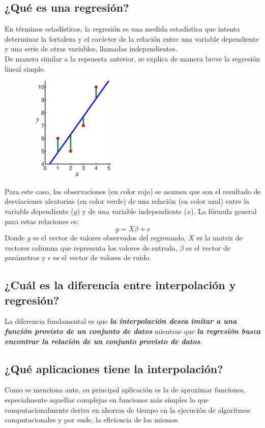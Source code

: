 \documentclass[letterpaper, 12pt]{article}
\begin{document}
\subsection*{¿Qué es una regresión?}
\justify
En términos estadísticos, la regresión es una medida estadística que intenta determinar la fortaleza y el carácter de la relación entre una variable dependiente
y una serie de otras variables, llamadas independientes. 
\\\newline
De manera similar a la repsuesta anterior, se explica de manera breve la regresión lineal simple.
\begin{figure}[H]
    \centering
    \includegraphics[width=5cm,height=5cm]{330px-Linear_least_squares_example2.png}
\end{figure}
\justify
Para este caso, las observaciones (en color rojo) se asumen que son el resultado de desviaciones aleatorias (en color verde) de una relación (en color azul) entre la variable dependiente (\(y\))
y de una variable independiente (\(x\)). La fórmula general para estas relaciones es:
{\large\[y=X\beta+\epsilon\]}
\justify
Donde \(y\) es el vector de valores observados del regresando, \(X\) es la matriz de vectores columna que representa los valores de entrada, \(\beta\) es el vector de parámetros y \(\epsilon\)
es el vector de valores de ruido.
\subsection*{¿Cuál es la diferencia entre interpolación y regresión?}
\justify
La diferencia fundamental es que \textbf{\emph{la interpolación desea imitar a una función provisto de un conjunto de datos}} mientras que \textbf{\emph{la regresión busca encontrar la relación de un conjunto provisto de datos}}.
\subsection*{¿Qué aplicaciones tiene la interpolación?}
\justify
Como se menciona ante, su principal aplicación es la de aproximar funciones, especialmente aquellas complejas en funciones más simples lo que computacionalmente deriva en ahorros de tiempo en la ejecución de algorítmos computacionales y por ende, la eficiencia de los mismos.
\end{document}
